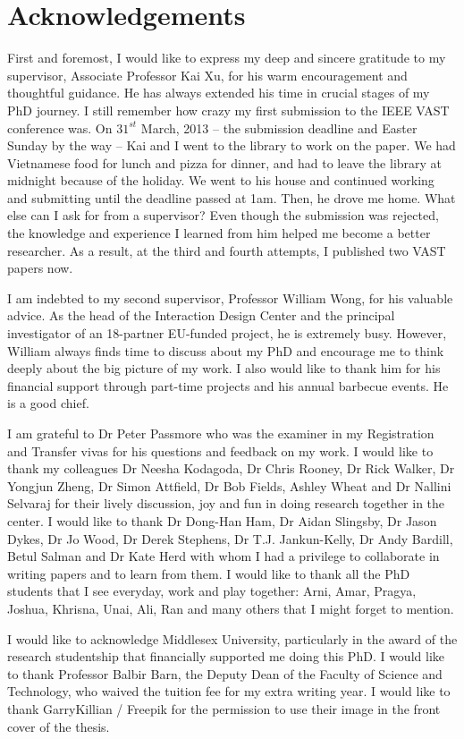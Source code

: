 \section*{Acknowledgements}
First and foremost, I would like to express my deep and sincere gratitude to my supervisor, Associate Professor Kai Xu, for his warm encouragement and thoughtful guidance. He has always extended his time in crucial stages of my PhD journey. I still remember how crazy my first submission to the IEEE VAST conference was. On $31^{st}$ March, 2013 -- the submission deadline and Easter Sunday by the way -- Kai and I went to the library to work on the paper. We had Vietnamese food for lunch and pizza for dinner, and had to leave the library at midnight because of the holiday. We went to his house and continued working and submitting until the deadline passed at 1am. Then, he drove me home. What else can I ask for from a supervisor? Even though the submission was rejected, the knowledge and experience I learned from him helped me become a better researcher. As a result, at the third and fourth attempts, I published two VAST papers now.

I am indebted to my second supervisor, Professor William Wong, for his valuable advice. As the head of the Interaction Design Center and the principal investigator of an 18-partner EU-funded project, he is extremely busy. However, William always finds time to discuss about my PhD and encourage me to think deeply about the big picture of my work. I also would like to thank him for his financial support through part-time projects and his annual barbecue events. He is a good chief.

I am grateful to Dr Peter Passmore who was the examiner in my Registration and Transfer vivas for his questions and feedback on my work. I would like to thank my colleagues Dr Neesha Kodagoda, Dr Chris Rooney, Dr Rick Walker, Dr Yongjun Zheng, Dr Simon Attfield, Dr Bob Fields, Ashley Wheat and Dr Nallini Selvaraj for their lively discussion, joy and fun in doing research together in the center. I would like to thank Dr Dong-Han Ham, Dr Aidan Slingsby, Dr Jason Dykes, Dr Jo Wood, Dr Derek Stephens, Dr T.J. Jankun-Kelly, Dr Andy Bardill,  Betul Salman and Dr Kate Herd with whom I had a privilege to collaborate in writing papers and to learn from them. I would like to thank all the PhD students that I see everyday, work and play together: Arni, Amar, Pragya, Joshua, Khrisna, Unai, Ali, Ran and many others that I might forget to mention.

I would like to acknowledge Middlesex University, particularly in the award of the research studentship that financially supported me doing this PhD. I would like to thank Professor Balbir Barn, the Deputy Dean of the Faculty of Science and Technology, who waived the tuition fee for my extra writing year. I would like to thank GarryKillian / Freepik for the permission to use their image in the front cover of the thesis.

